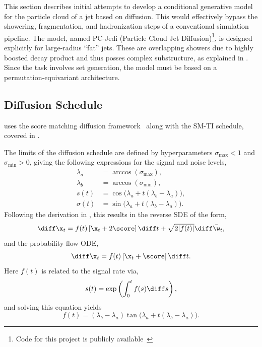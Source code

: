 This section describes initial attempts to develop a conditional generative model for the particle cloud of a jet based on diffusion.
This would effectively bypass the showering, fragmentation, and hadronization steps of a conventional simulation pipeline.
The model, named PC-Jedi (Particle Cloud Jet Diffusion)\footnote{Code for this project is publicly available~\cite{PCJediCode}}, is designed explicitly for large-radius ``fat'' jets.
These are overlapping showers due to highly boosted decay product and thus posses complex substructure, as explained in .
Since the task involves set generation, the model must be based on a permutation-equivariant architecture.

\subsection{Diffusion Schedule}

\pcjedi uses the score matching diffusion framework~\cite{ScoreBasedGenerativeModeling} along with the SM-TI schedule, covered in .

The limits of the diffusion schedule are defined by hyperparameters $\sigma_\text{max}<1$ and $\sigma_\text{min}>0$, giving the following expressions for the signal and noise levels,
\begin{align}
    \lambda_a & = \arccos(\sigma_\text{max}),                           \\
    \lambda_b & = \arccos(\sigma_\text{min}),                           \\
    s(t)      & = \cos\bigl(\lambda_a + t(\lambda_b - \lambda_a)\bigr), \\
    \sigma(t) & = \sin\bigl(\lambda_a + t(\lambda_b - \lambda_a)\bigr).
\end{align}
Following the derivation in , this results in the reverse SDE of the form,
\begin{equation}
    \label{eq:jedi_reverse_vp_sde}
    \diff\x_t = f(t) \left[ \x_t + 2 \score \right] \diff t + \sqrt{2 |f(t)|} \diff \bar\w_t,
\end{equation}
and the probability flow ODE,
\begin{equation}
    \label{eq:jedi_vp_ode}
    \diff \x_t = f(t) \left[ \x_t + \score \right] \diff t.
\end{equation}
Here $f(t)$ is related to the signal rate via,
\begin{equation}
    s(t) = \exp\left(\int_0^t f(s) \diff s\right),
\end{equation}
and solving this equation yields
\begin{equation}
    f(t) = (\lambda_b - \lambda_a) \tan\bigl(\lambda_a + t(\lambda_b - \lambda_a)\bigr).
\end{equation}

